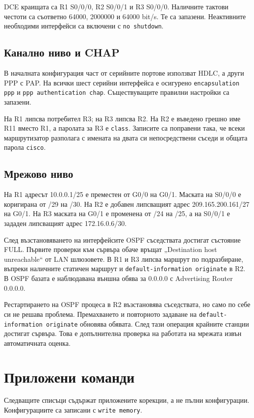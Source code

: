 \documentclass[12pt]{article}
\begin{document}
DCE краищата са R1 S0/0/0, R2 S0/0/1 и R3 S0/0/0. Наличните тактови честоти са съответно 64000, 2000000 и 64000 bit/s. Те са запазени. Неактивните необходими интерфейси са включени с \texttt{no shutdown}.

\subsection{Канално ниво и CHAP}
В началната конфигурация част от серийните портове използват HDLC, а други PPP с PAP. На всички шест серийни интерфейса е осигурено \texttt{encapsulation ppp} и \texttt{ppp authentication chap}. Съществуващите правилни настройки са запазени.

На R1 липсва потребител R3; на R3 липсва R2. На R2 е въведено грешно име R11 вместо R1, а паролата за R3 е \texttt{class}. Записите са поправени така, че всеки маршрутизатор разполага с имената на двата си непосредствени съседи и общата парола \texttt{cisco}.

\subsection{Мрежово ниво}
На R1 адресът 10.0.0.1/25 е преместен от G0/0 на G0/1. Маската на S0/0/0 е коригирана от /29 на /30. На R2 е добавен липсващият адрес 209.165.200.161/27 на G0/1. На R3 маската на G0/1 е променена от /24 на /25, а на S0/0/1 е зададен липсващият адрес 172.16.0.6/30.

След възстановяването на интерфейсите OSPF съседствата достигат състояние FULL. Първите проверки към сървъра обаче връщат „Destination host unreachable“ от LAN шлюзовете. В R1 и R3 липсва маршрут по подразбиране, въпреки наличните статичен маршрут и \texttt{default-information originate} в R2. В OSPF базата е наблюдавана външна обява за 0.0.0.0 с Advertising Router 0.0.0.0.

Рестартирането на OSPF процеса в R2 възстановява съседствата, но само по себе си не решава проблема. Премахването и повторното задаване на \texttt{default-information originate} обновява обявата. След тази операция крайните станции достигат сървъра. Това е допълнителна проверка на работата на мрежата извън автоматичната оценка.

\section{Приложени команди}
Следващите списъци съдържат приложените корекции, а не пълни конфигурации. Конфигурациите са записани с \texttt{write memory}.
\end{document}

